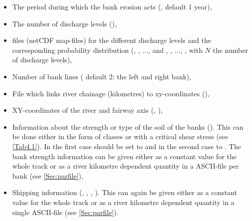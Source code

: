 \begin{itemize}
\item The period during which the bank erosion acts (, default 1 year),
\item The number of discharge levels (),
\item \dflowfm files (netCDF map-files) for the different discharge levels and the corresponding
probability distribution (, , ...,  and
, , ..., , with $N$ the number of
discharge levels),
\item Number of bank lines ( default 2: the left and right bank),
\item File which links river chainage (kilometres) to xy-coordinates (),
\item XY-coordinates of the river and fairway axis (, ),
\item Information about the strength or type of the soil of the banks ().
This can be done either in the form of classes or with a critical shear stress (see \autoref{Tab4.1}).
In the first case  should be set to  and in the second case to .
The bank strength information can be given either as a constant value for the whole track or as a river kilometre dependent quantity in a ASCII-file per bank (see \autoref{Sec:parfile}),
\item Shipping information (, , , ).
This can again be given either as a constant value for the whole track or as a river kilometre dependent quantity in a single ASCII-file (see \autoref{Sec:parfile}).
\end{itemize}



